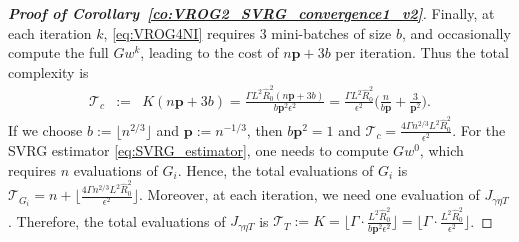 \documentclass{article}
\newcommand{\Tc}{\mathcal{T}}
\newcommand{\mbf}[1]{\mathbf{#1}}
\theoremstyle{plain}
\theoremstyle{definition}
\theoremstyle{remark}
\begin{document}
\begin{proof}[\textbf{Proof of Corollary~\ref{co:VROG2_SVRG_convergence1_v2}}]
Finally, at each iteration $k$, \eqref{eq:VROG4NI} requires $3$ mini-batches of size $b$, and occasionally compute the full $Gw^k$, leading to the cost of $n\mbf{p} + 3b$ per iteration.
Thus the total complexity is 
\begin{equation*}
\begin{array}{lcl}
\Tc_{c} & := & K(n\mbf{p} + 3b) = \frac{ \Gamma L^2 \hat{R}_0^2(n\mbf{p} + 3b)}{ b\mbf{p}^2\epsilon^2} = \frac{\Gamma L^2 \hat{R}_0^2}{\epsilon^2}\big(\frac{n}{b\mbf{p}} + \frac{3}{ \mbf{p}^2} \big).
\end{array}
\end{equation*}
If we choose $b := \lfloor n^{2/3} \rfloor$ and $\mbf{p} := n^{-1/3}$, then $b\mbf{p}^2 = 1$ and $\Tc_{c} = \frac{4\Gamma n^{2/3} L^2 \hat{R}_0^2}{\epsilon^2}$.
For the SVRG estimator \eqref{eq:SVRG_estimator}, one needs to compute $Gw^0$, which requires $n$ evaluations of $G_i$.
Hence, the total  evaluations of $G_i$ is $\Tc_{G_i} = n + \big\lfloor \frac{4\Gamma n^{2/3} L^2 \hat{R}_0^2}{\epsilon^2} \big\rfloor$.
Moreover, at each iteration, we need one evaluation of $J_{\gamma\eta T}$.
Therefore, the total evaluations of $J_{\gamma\eta T}$ is $\Tc_{T} := K = \big\lfloor \Gamma \cdot \frac{L^2 \hat{R}_0^2}{ b\mbf{p}^2\epsilon^2} \big\rfloor = \big\lfloor \Gamma \cdot \frac{L^2 \hat{R}_0^2}{\epsilon^2} \big\rfloor$.
\end{proof}
\end{document}

